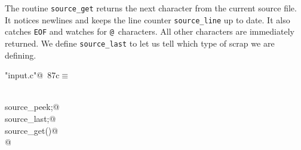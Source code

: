 \documentclass[a4paper]{report}
\begin{document}
The routine \verb|source_get| returns the next character from the
current source file. It notices newlines and keeps the line counter
\verb|source_line| up to date. It also catches \verb|EOF| and watches
for \verb|@|~characters. All other characters are immediately returned.
We define \verb|source_last| to let us tell which type of scrap we
are defining.
\begin{flushleft} \small
\begin{minipage}{\linewidth}\label{scrap181}\raggedright\small
{} \verb@"input.c"@\nobreak\ {\footnotesize {87c}}$\equiv$
\vspace{-1ex}
\begin{list}{}{} \item
\mbox{}\verb@@\\
\mbox{}\verb@int source_peek;@\\
\mbox{}\verb@int source_last;@\\
\mbox{}\verb@int source_get()@\\
\mbox{}@\\
\mbox{}\verb@@{\NWsep}
\end{list}
\vspace{-1.5ex}

\end{minipage}
\end{flushleft}
\end{document}
